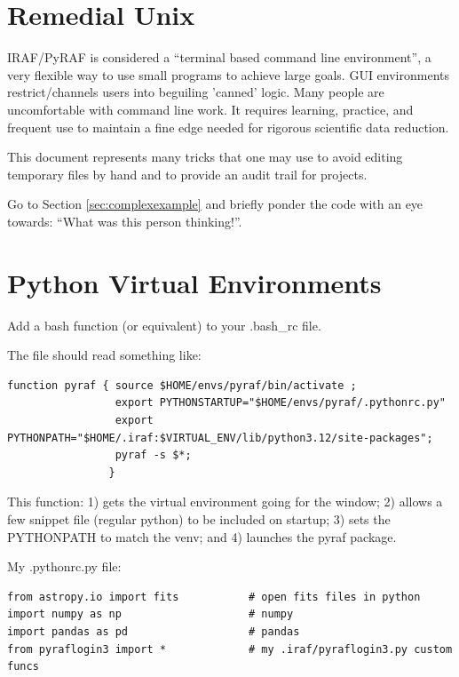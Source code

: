 \renewcommand{\footerfilename}{RemedialUnix.tex}


\section{Remedial Unix}  \label{RemedialUnix}IRAF/PyRAF is considered a ``terminal based command line
environment'', a very flexible way to use small programs to achieve
large goals. GUI environments restrict/channels users into beguiling
'canned' logic. Many people are uncomfortable with command line
work. It requires learning, practice, and frequent use to maintain a
fine edge needed for rigorous scientific data reduction.

This  document represents many tricks that one may use
to avoid editing temporary files by hand and to provide an audit trail
for projects.

Go to Section \ref{sec:complexexample} and briefly ponder the code with an
eye towards: ``What was this person thinking!''.

\section*{Python Virtual Environments}

Add a bash function (or equivalent) to your .bash\_rc file.

The file should read something like:

\begingroup \fontsize{10pt}{10pt}
\selectfont
\begin{verbatim} 
function pyraf { source $HOME/envs/pyraf/bin/activate ;
                 export PYTHONSTARTUP="$HOME/envs/pyraf/.pythonrc.py"
                 export PYTHONPATH="$HOME/.iraf:$VIRTUAL_ENV/lib/python3.12/site-packages";
                 pyraf -s $*;
                }
\end{verbatim}
\endgroup

This function: 1) gets the virtual environment going for the window;
2) allows a few snippet file (regular python) to be included on
startup; 3) sets the PYTHONPATH to match the venv; and 4) launches the
pyraf package.

My .pythonrc.py file:
\begingroup \fontsize{10pt}{10pt}
\selectfont
\begin{verbatim} 
from astropy.io import fits           # open fits files in python
import numpy as np                    # numpy
import pandas as pd                   # pandas
from pyraflogin3 import *             # my .iraf/pyraflogin3.py custom funcs
\end{verbatim}
\endgroup


